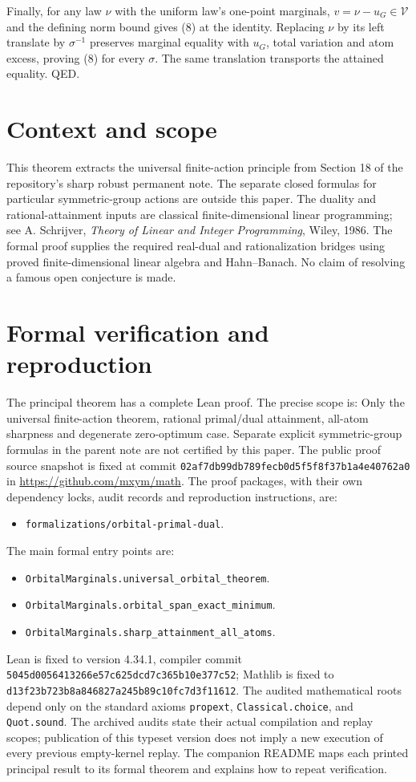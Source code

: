 \documentclass[11pt]{article}
\begin{document}
Finally, for any law \(\nu\) with the uniform law's one-point marginals,
\(v=\nu-u_G\in\mathcal V\) and the defining norm bound gives (8) at the
identity. Replacing \(\nu\) by its left translate by \(\sigma^{-1}\)
preserves marginal equality with \(u_G\), total variation and atom
excess, proving (8) for every \(\sigma\). The same translation
transports the attained equality. QED.

\section{Context and scope}\label{context-and-scope}

This theorem extracts the universal finite-action principle from Section
18 of the repository's sharp robust permanent note. The separate closed
formulas for particular symmetric-group actions are outside this paper.
The duality and rational-attainment inputs are classical
finite-dimensional linear programming; see A. Schrijver, \emph{Theory of
Linear and Integer Programming}, Wiley, 1986. The formal proof supplies
the required real-dual and rationalization bridges using proved
finite-dimensional linear algebra and Hahn--Banach. No claim of
resolving a famous open conjecture is made.

\section{Formal verification and reproduction}
The principal theorem has a complete Lean proof. The precise scope is:
Only the universal finite-action theorem, rational primal/dual attainment, all-atom sharpness and degenerate zero-optimum case. Separate explicit symmetric-group formulas in the parent note are not certified by this paper.
The public proof source snapshot is fixed at commit
\nolinkurl{02af7db99db789fecb0d5f5f8f37b1a4e40762a0} in \url{https://github.com/mxym/math}.
The proof packages, with their own dependency locks, audit records and
reproduction instructions, are:
\begin{itemize}
\item \nolinkurl{formalizations/orbital-primal-dual}.
\end{itemize}
The main formal entry points are:
\begin{itemize}
\item \nolinkurl{OrbitalMarginals.universal_orbital_theorem}.
\item \nolinkurl{OrbitalMarginals.orbital_span_exact_minimum}.
\item \nolinkurl{OrbitalMarginals.sharp_attainment_all_atoms}.
\end{itemize}
Lean is fixed to version 4.34.1, compiler commit
\nolinkurl{5045d0056413266e57c625dcd7c365b10e377c52}; Mathlib is fixed to
\nolinkurl{d13f23b723b8a846827a245b89c10fc7d3f11612}.
The audited mathematical roots depend only on the standard axioms
\texttt{propext}, \texttt{Classical.choice}, and \texttt{Quot.sound}.
The archived audits state their actual compilation and replay scopes;
publication of this typeset version does not imply a new execution of every
previous empty-kernel replay. The companion README maps each printed
principal result to its formal theorem and explains how to repeat verification.
\end{document}

